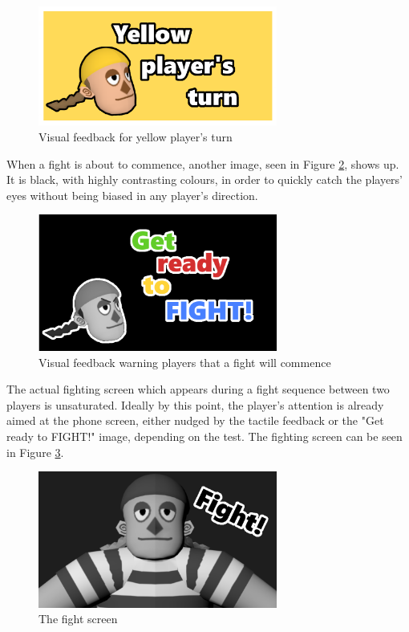 \begin{figure}[h!]
	\centering
	\includegraphics[width=0.7\textwidth]{figures/yellowturn.png}
	\caption{Visual feedback for yellow player's turn}
	\label{fig:yellow_turn}
\end{figure}

When a fight is about to commence, another image, seen in Figure \ref{fig:get_ready}, shows up. It is black, with highly contrasting colours, in order to quickly catch the players' eyes without being biased in any player's direction.

\begin{figure}[h!]
	\centering
	\includegraphics[width=0.7\textwidth]{figures/getready.png}
	\caption{Visual feedback warning players that a fight will commence}
	\label{fig:get_ready}
\end{figure}

The actual fighting screen which appears during a fight sequence between two players is unsaturated. Ideally by this point, the player's attention is already aimed at the phone screen, either nudged by the tactile feedback or the "Get ready to FIGHT!" image, depending on the test. The fighting screen can be seen in Figure \ref{fig:fight}.

\begin{figure}[h!]
	\centering
	\includegraphics[width=0.7\textwidth]{figures/fight.png}
	\caption{The fight screen}
	\label{fig:fight}
\end{figure}

